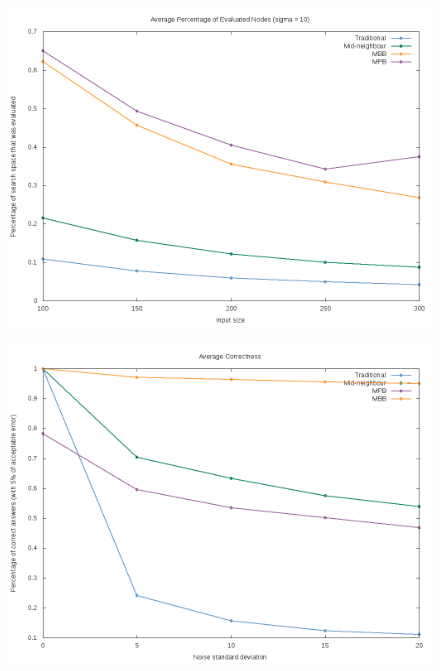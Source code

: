 \documentclass[12pt]{article}
\begin{document}
\begin{figure}[H]
        \centering
        \includegraphics[scale=.5]{evaluations_result}
\end{figure}
\begin{figure}[H]
        \centering
        \includegraphics[scale=.5]{correctness_result}
\end{figure}
\end{document}
